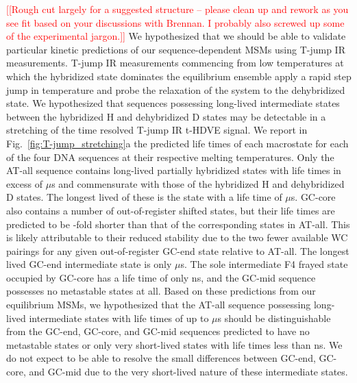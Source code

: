 \documentclass[journal=jpcbfk,manuscript=article]{achemso}
\newcommand*{\rood}[1]{{\color{red}{#1}}}
\newcommand*{\noter}[1]{\textcolor{red}{[[#1]]}}		%
\begin{document}
\noter{Rough cut largely for a suggested structure -- please clean up and rework as you see fit based on your discussions with Brennan. I probably also screwed up some of the experimental jargon.} We hypothesized that we should be able to validate particular kinetic predictions of our sequence-dependent MSMs using T-jump IR measurements. T-jump IR measurements commencing from low temperatures at which the hybridized state dominates the equilibrium ensemble apply a rapid step jump in temperature and probe the relaxation of the system to the dehybridized state. We hypothesized that sequences possessing long-lived intermediate states between the hybridized H and dehybridized D states may be detectable in a stretching of the time resolved T-jump IR t-HDVE signal. We report in Fig.~\ref{fig:T-jump_stretching}a the predicted life times of each macrostate for each of the four DNA sequences at their respective melting temperatures. Only the AT-all sequence contains long-lived partially hybridized states with life times in excess of \rood{XX} $\mu$s and commensurate with those of the hybridized H and dehybridized D states. The longest lived of these is the \rood{XX} state with a life time of \rood{XX} $\mu$s. GC-core also contains a number of out-of-register shifted states, but their life times are predicted to be \rood{XX}-fold shorter than that of the corresponding states in AT-all. This is likely attributable to their reduced stability due to the two fewer available WC pairings for any given out-of-register GC-end state relative to AT-all. The longest lived GC-end intermediate state is only \rood{XX} $\mu$s. The sole intermediate F4 frayed state occupied by GC-core has a life time of only \rood{XX} ns, and the GC-mid sequence possesses no metastable states at all. Based on these predictions from our equilibrium MSMs, we hypothesized that the AT-all sequence possessing long-lived intermediate states with life times of up to \rood{XX} $\mu$s should be distinguishable from the GC-end, GC-core, and GC-mid sequences predicted to have no metastable states or only very short-lived states with life times less than \rood{XX} ns. We do not expect to be able to resolve the small differences between GC-end, GC-core, and GC-mid due to the very short-lived nature of these intermediate states.
\end{document}
